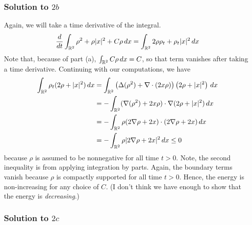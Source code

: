 \subsubsection*{Solution to $2b$}

Again, we will take a time derivative of the integral.
$$ \frac{d}{dt} \int_{\mathbb{R}^2} \rho^2 + \rho |x|^2 + C \rho \, dx = \int_{\mathbb{R}^2} 2 \rho \rho_t + \rho_t |x|^2 \, dx $$
Note that, because of part (a), $\int_{\mathbb{R}^2} C \rho \, dx = C$, so that term vanishes after taking a time derivative. Continuing with our computations, we have
\begin{align*}
\int_{\mathbb{R}^2} \rho_t(2\rho + |x|^2) \, dx &= \int_{\mathbb{R}^2} \left( \Delta  (\rho^2) + \nabla \cdot (2x \rho) \right) \left( 2\rho + |x|^2 \right) \, dx \\
&= -\int_{\mathbb{R}^2} (\nabla (\rho^2) + 2x \rho) \cdot \nabla (2\rho + |x|^2) \, dx \\
&= -\int_{\mathbb{R}^2} \rho (2 \nabla \rho + 2x) \cdot (2\nabla \rho + 2x) \, dx \\
&= -\int_{\mathbb{R}^2} \rho |2 \nabla \rho + 2x|^2 \, dx \leq 0
\end{align*}
because $\rho$ is assumed to be nonnegative for all time $t>0$. Note, the second inequality is from applying integration by parts. Again, the boundary terms vanish because $\rho$ is compactly supported for all time $t>0$. Hence, the energy is non-increasing for any choice of $C$. (I don't think we have enough to show that the energy is \emph{decreasing}.)

\subsubsection*{Solution to $2c$}

